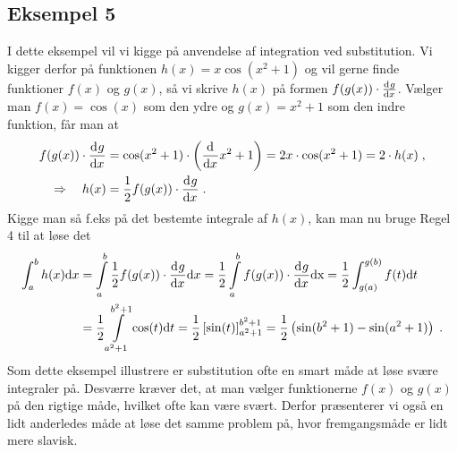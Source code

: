 \subsection{Eksempel 5}
I dette eksempel vil vi kigge på anvendelse af integration ved substitution. Vi kigger derfor på funktionen $h(x) = x \cos \left( x^2 + 1 \right)$ og vil gerne finde funktioner $f(x)$ og $g(x)$, så vi skrive $h(x)$ på formen $f(g(x)) \cdot \dif{x}{g}$. Vælger man $f(x)  = \cos(x)$ som den ydre og $g(x) = x^2 + 1$ som den indre funktion, får man at
\begin{align*}
f(g(x)) \cdot \dif{x}{g} &= \cos(x^2+1) \cdot \left( \dif{x}{} x^2+1 \right) = 2x \cdot \cos(x^2+1) = 2 \cdot h(x) \; , \\
\Rightarrow \quad h(x) & = \frac{1}{2}f(g(x)) \cdot \dif{x}{g} \; .
\end{align*}
Kigge man så f.eks på det bestemte integrale af $h(x)$, kan man nu bruge Regel 4 til at løse det
\begin{align*}
\int_a^b h(x) \text{d}x &=  \int\limits_{a}^{b} \frac{1}{2} f(g(x)) \cdot \dif{x}{g}   \text{d}x = \frac{1}{2} \int\limits_{a}^{b} f(g(x)) \cdot \dif{x}{g} \text{dx} = \frac{1}{2} \int_{g(a)}^{g(b)} f(t) \text{d}t \\
&= \frac{1}{2} \int\limits_{a^2+1}^{b^2+1} \cos(t) \text{d}t = \frac{1}{2} \left[ \sin(t) \right]_{a^2 + 1}^{b^2 + 1} = \frac{1}{2} \left( \sin(b^2+1) - \sin(a^2+1) \right) \; . 
\end{align*}
Som dette eksempel illustrere er substitution ofte en smart måde at løse svære integraler på. Desværre kræver det, at man vælger funktionerne $f(x)$ og $g(x)$ på den rigtige måde, hvilket ofte kan være svært. Derfor præsenterer vi også en lidt anderledes måde at løse det samme problem på, hvor fremgangsmåde er lidt mere slavisk.\\

